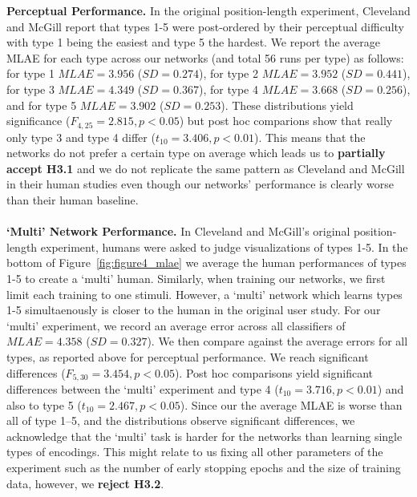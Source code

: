 \noindent\textbf{Perceptual Performance.} In the original position-length experiment, Cleveland and McGill report that types 1-5 were post-ordered by their perceptual difficulty with type 1 being the easiest and type 5 the hardest. We report the average MLAE for each type across our networks (and total 56 runs per type) as follows: 
for type 1 $MLAE= 3.956 $ ($SD= 0.274 $),
for type 2 $MLAE= 3.952 $ ($SD= 0.441 $),
for type 3  $MLAE= 4.349 $ ($SD= 0.367 $),
for type 4 $MLAE= 3.668 $ ($SD= 0.256 $), and 
for type 5 $MLAE= 3.902 $ ($SD= 0.253 $). These distributions yield significance ($F_{4,25}=2.815, p<0.05$) but post hoc comparions show that really only type 3 and type 4 differ ($t_{10}=3.406, p<0.01$). This means that the networks do not prefer a certain type on average which leads us to \textbf{partially accept H3.1} and we do not replicate the same pattern as Cleveland and McGill in their human studies even though our networks' performance is clearly worse than their human baseline.
\\~\\
\noindent\textbf{`Multi' Network Performance.} In Cleveland and McGill's original position-length experiment, humans were asked to judge visualizations of types 1-5. In the bottom of Figure~\ref{fig:figure4_mlae} we average the human performances of types 1-5 to create a `multi' human. Similarly, when training our networks, we first limit each training to one stimuli. However, a `multi' network which learns types 1-5 simultaenously is closer to the human in the original user study. For our `multi' experiment, we record an average error across all classifiers of $MLAE=4.358$ ($SD=0.327$). We then compare against the average errors for all types, as reported above for perceptual performance. We reach significant differences ($F_{5,30}=3.454,p<0.05$). Post hoc comparisons yield significant differences between the `multi' experiment and type 4 ($t_{10}=3.716, p<0.01$) and also to type 5 ($t_{10}=2.467, p<0.05$). Since our the average MLAE is worse than all of type 1--5, and the distributions observe significant differences, we acknowledge that the `multi' task is harder for the networks than learning single types of encodings. This might relate to us fixing all other parameters of the experiment such as the number of early stopping epochs and the size of training data, however, we \textbf{reject H3.2}.


